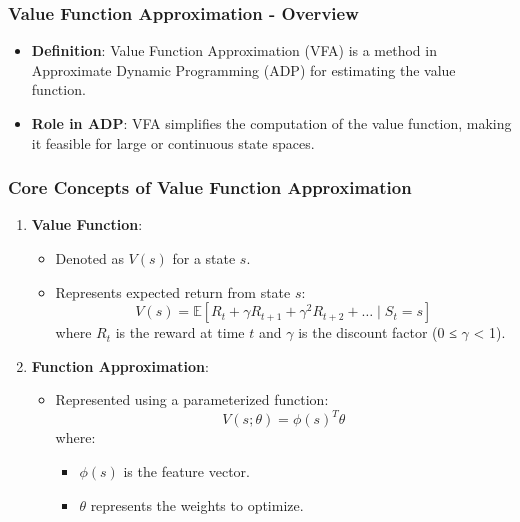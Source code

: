 \documentclass[aspectratio=169]{beamer}
\begin{document}
\begin{frame}[fragile]
    \frametitle{Value Function Approximation - Overview}
    \begin{itemize}
        \item \textbf{Definition}: Value Function Approximation (VFA) is a method in Approximate Dynamic Programming (ADP) for estimating the value function.
        \item \textbf{Role in ADP}: VFA simplifies the computation of the value function, making it feasible for large or continuous state spaces.
    \end{itemize}
\end{frame}

\begin{frame}[fragile]
    \frametitle{Core Concepts of Value Function Approximation}
    \begin{enumerate}
        \item \textbf{Value Function}:
        \begin{itemize}
            \item Denoted as \( V(s) \) for a state \( s \).
            \item Represents expected return from state \( s \):
            \begin{equation}
            V(s) = \mathbb{E} \left[ R_t + \gamma R_{t+1} + \gamma^2 R_{t+2} + \ldots \mid S_t = s \right]
            \end{equation}
            where \( R_t \) is the reward at time \( t \) and \( \gamma \) is the discount factor (0 ≤ \( \gamma \) < 1).
        \end{itemize}
        
        \item \textbf{Function Approximation}:
        \begin{itemize}
            \item Represented using a parameterized function:
            \begin{equation}
            V(s; \theta) = \phi(s)^T \theta
            \end{equation}
            where:
            \begin{itemize}
                \item \( \phi(s) \) is the feature vector.
                \item \( \theta \) represents the weights to optimize.
            \end{itemize}
        \end{itemize}
    \end{enumerate}
\end{frame}
\end{document}
